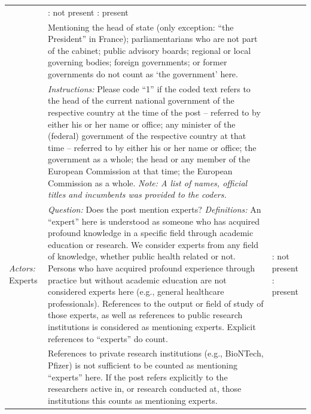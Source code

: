 \documentclass[
]{ccr}
\begin{document}
{\begin{spacing}{1}
\begin{longtable}[]{@{}
  >{\raggedright\arraybackslash}p{.14\linewidth}
  >{\raggedright\arraybackslash}p{.62\linewidth}
  >{\raggedright\arraybackslash}p{.13\linewidth}@{}}
\newline
& 
0: not present \newline
1: present
\\ 
& 
Mentioning the head of state (only exception: “the President” in France); parliamentarians who are not part of the cabinet; public advisory boards; regional or local governing bodies; foreign governments; or former governments do not count as ‘the government’ here. \newline
&
\\
&
\emph{Instructions:} \newline
Please code “1” if the coded text refers to the head of the current national government of the respective country at the time of the post – referred to by either his or her name or office; any minister of the (federal) government of the respective country at that time – referred to by either his or her name or office; the government as a whole; the head or any member of the European Commission at that time; the European Commission as a whole. 
\newline \newline 
\emph{Note: A list of names, official titles and incumbents was provided to the coders.}
&
\\
\emph{Actors:}
Experts
&
\emph{Question:} \newline Does the post mention experts? \newline \newline
\emph{Definitions:} \newline An “expert” here is understood as someone who has acquired profound knowledge in a specific field through academic education or research. We consider experts from any field of knowledge, whether public health related or not. Persons who have acquired profound experience through practice but without academic education are not considered experts here (e.g., general healthcare professionals). References to the output or field of study of those experts, as well as references to public research institutions is considered as mentioning experts. Explicit references to “experts” do count. 
& 
0: not present \newline
1: present
\\ 
&
References to private research institutions (e.g., BioNTech, Pfizer) is not sufficient to be counted as mentioning “experts” here. If the post refers explicitly to the researchers active in, or research conducted at, those institutions this counts as mentioning experts. \newline

\end{longtable}
\end{spacing}}
\end{document}
